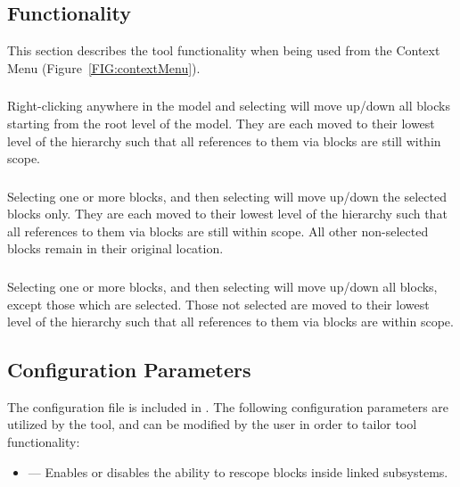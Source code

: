 \documentclass{article}
\newcommand{\menu}[2]{%
	\ifthenelse{\equal{#1}{1}}{Rescope All}{}%
  	\ifthenelse{\equal{#1}{2}}{Rescope Selected}{}%
  	\ifthenelse{\equal{#1}{3}}{Rescope Non-Selected}{}%
}
\newcommand{\toolFolder}{\cmd{DataStoreRescope}}
\begin{document}
\subsection{Functionality}
This section describes the tool functionality when being used from the \Simulink Context Menu (Figure~\ref{FIG:contextMenu}).

\subsubsection*{}
Right-clicking anywhere in the model and selecting  will move up/down all \DSM blocks starting from the root level of the model. They are each moved to their lowest level of the hierarchy such that all references to them via \DSRW blocks are still within scope. 

\subsubsection*{}
Selecting one or more \DSM blocks, and then selecting  will move up/down the selected \DSM blocks only. They are each moved to their lowest level of the hierarchy such that all references to them via \DSRW blocks are still within scope. All other non-selected \DSM blocks remain in their original location.

\subsubsection*{}
Selecting one or more \DSM blocks, and then selecting  will move up/down all \DSM blocks, except those which are selected. Those not selected are moved to their lowest level of the hierarchy such that all references to them via \DSRW blocks are within scope.

\subsection{Configuration Parameters}
The configuration file  is included in \cmd{\toolFolder\textbackslash src}. The following configuration parameters are utilized by the tool, and can be modified by the user in order to tailor tool functionality:

\begin{itemize}
	\item {} --- Enables or disables the ability to rescope \DSM blocks inside linked subsystems.
\end{itemize}
\end{document}
